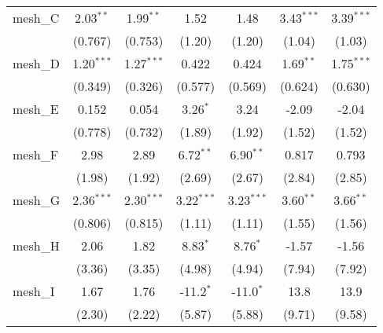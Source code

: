 \begin{tabular}{lcccccc}
   mesh\_C                                                     & 2.03$^{**}$   & 1.99$^{**}$   & 1.52         & 1.48          & 3.43$^{***}$   & 3.39$^{***}$\\   
                                                               & (0.767)       & (0.753)       & (1.20)       & (1.20)        & (1.04)         & (1.03)\\   
   mesh\_D                                                     & 1.20$^{***}$  & 1.27$^{***}$  & 0.422        & 0.424         & 1.69$^{**}$    & 1.75$^{***}$\\   
                                                               & (0.349)       & (0.326)       & (0.577)      & (0.569)       & (0.624)        & (0.630)\\   
   mesh\_E                                                     & 0.152         & 0.054         & 3.26$^{*}$   & 3.24          & -2.09          & -2.04\\   
                                                               & (0.778)       & (0.732)       & (1.89)       & (1.92)        & (1.52)         & (1.52)\\   
   mesh\_F                                                     & 2.98          & 2.89          & 6.72$^{**}$  & 6.90$^{**}$   & 0.817          & 0.793\\   
                                                               & (1.98)        & (1.92)        & (2.69)       & (2.67)        & (2.84)         & (2.85)\\   
   mesh\_G                                                     & 2.36$^{***}$  & 2.30$^{***}$  & 3.22$^{***}$ & 3.23$^{***}$  & 3.60$^{**}$    & 3.66$^{**}$\\   
                                                               & (0.806)       & (0.815)       & (1.11)       & (1.11)        & (1.55)         & (1.56)\\   
   mesh\_H                                                     & 2.06          & 1.82          & 8.83$^{*}$   & 8.76$^{*}$    & -1.57          & -1.56\\   
                                                               & (3.36)        & (3.35)        & (4.98)       & (4.94)        & (7.94)         & (7.92)\\   
   mesh\_I                                                     & 1.67          & 1.76          & -11.2$^{*}$  & -11.0$^{*}$   & 13.8           & 13.9\\   
                                                               & (2.30)        & (2.22)        & (5.87)       & (5.88)        & (9.71)         & (9.58)\\   

\end{tabular}

